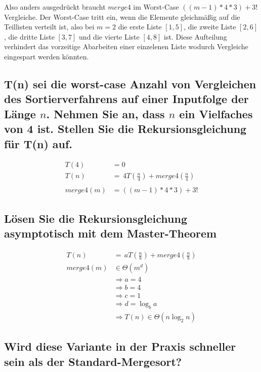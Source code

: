 \documentclass{article}
\begin{document}
Also anders ausgedrückt braucht $merge4$ im Worst-Case $((m - 1) * 4 * 3) + 3!$
Vergleiche.  Der Worst-Case tritt ein, wenn die Elemente gleichmäßig auf die
Teillisten verteilt ist, also bei $m = 2$ die erste Liste $[1, 5]$, die zweite
Liste $[2, 6]$, die dritte Liste $[3, 7]$ und die vierte Liste $[4, 8]$ ist.
Diese Aufteilung verhindert das vorzeitige Abarbeiten einer einzelenen Liste
wodurch Vergleiche eingespart werden könnten.

\subsection{T(n) sei die worst-case Anzahl von Vergleichen des
Sortierverfahrens auf einer Inputfolge der Länge $n$. Nehmen Sie an, dass $n$
ein Vielfaches von 4 ist.  Stellen Sie die Rekursionsgleichung für T(n) auf.}

\begin{align*}
	         T(4) & = 0                                        \\
	         T(n) & = \, 4T(\frac{n}{4}) + merge4(\frac{n}{4}) \\
	\\
	    merge4(m) & = ((m - 1) * 4 * 3) + 3!
\end{align*}

\subsection{Lösen Sie die Rekursionsgleichung asymptotisch mit dem
Master-Theorem}

\begin{align*}
	         T(n) & = \, aT(\frac{n}{b}) + merge4(\frac{n}{b}) \\
		merge4(m) & \in \Theta(m^d)                            \\
				  & \Rightarrow a = 4                          \\
				  & \Rightarrow b = 4                          \\
				  & \Rightarrow c = 1                          \\
				  & \Rightarrow d = \log_b a                   \\
				  & \Rightarrow T(n) \in \Theta(n \log_2 n)
\end{align*}


\subsection{Wird diese Variante in der Praxis schneller sein als der
Standard-Mergesort?}
\end{document}
